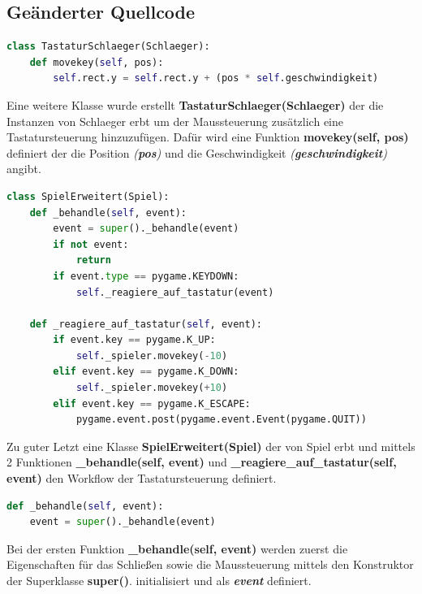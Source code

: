 \documentclass[a4paper,12pt]{article}
\begin{document}
\subsection{Geänderter Quellcode}
\begin{lstlisting}[language=Python, captionpos=b, caption={Aufgabe 3: TastaturSchlaeger(Schlaeger)}, label=lst:aufgabe-3-tastaturschlaeger-schlaeger]
class TastaturSchlaeger(Schlaeger):
    def movekey(self, pos):
        self.rect.y = self.rect.y + (pos * self.geschwindigkeit)
\end{lstlisting}
\par \vspace\baselineskip
Eine weitere Klasse wurde erstellt \textbf{TastaturSchlaeger(Schlaeger)} der die Instanzen von Schlaeger erbt um der Maussteuerung zusätzlich eine Tastatursteuerung hinzuzufügen. Dafür wird eine Funktion \textbf{movekey(self, pos)} definiert der die Position \textit{(\textbf{pos})} und die Geschwindigkeit \textit{(\textbf{geschwindigkeit})} angibt. \par \vspace\baselineskip
\begin{lstlisting}[language=Python, captionpos=b, caption={Aufgabe 3: SpielErweitert(Spiel)}, label=lst:aufgabe-3-spielerweitert-Spiel]
class SpielErweitert(Spiel):
    def _behandle(self, event):
        event = super()._behandle(event)
        if not event:
            return
        if event.type == pygame.KEYDOWN:
            self._reagiere_auf_tastatur(event)
    
    def _reagiere_auf_tastatur(self, event):
        if event.key == pygame.K_UP:
            self._spieler.movekey(-10)
        elif event.key == pygame.K_DOWN:
            self._spieler.movekey(+10)
        elif event.key == pygame.K_ESCAPE:
            pygame.event.post(pygame.event.Event(pygame.QUIT))
\end{lstlisting}
\par \vspace\baselineskip
Zu guter Letzt eine Klasse \textbf{SpielErweitert(Spiel)} der von Spiel erbt und mittels 2 Funktionen \textbf{\_behandle(self, event)} und \textbf{\_reagiere\_auf\_tastatur(self, event)} den Workflow der Tastatursteuerung definiert. \par \vspace\baselineskip
\begin{lstlisting}[language=Python, captionpos=b, caption={Aufgabe 3: \_behandle(self,event)}, label=lst:aufgabe-3-behandle-self-event]
def _behandle(self, event):
    event = super()._behandle(event)
\end{lstlisting}
\par \vspace\baselineskip
Bei der ersten Funktion \textbf{\_behandle(self, event)} werden zuerst die Eigenschaften für das Schließen sowie die Maussteuerung mittels den Konstruktor der Superklasse \textbf{super()}. initialisiert und als \textit{\textbf{event}} definiert.
\end{document}
